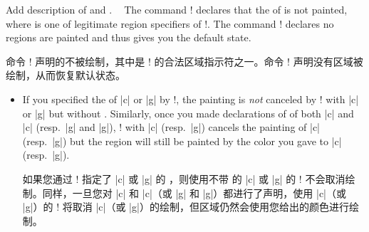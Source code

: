 \begin{description}



\item[\Midx{\!\nobackgroundcolor!}\marg{region}]\mbox{}
\Item[\Midx{\!\resetbackgroundcolor!}]\mbox{}\par
{}
{Add description of  and
    .}

The command \!\nobackgroundcolor! declares that the \bground{} of
 is not painted, where  is one of legitimate
region specifiers of \!\backgroundcolor!.  The command
\!\resetbackgroundcolor! declares no regions are painted and thus gives
you the default state.

命令 \!\nobackgroundcolor! 声明的\bground{}不被绘制，其中是 \!\backgroundcolor! 的合法区域指示符之一。命令 \!\resetbackgroundcolor! 声明没有区域被绘制，从而恢复默认状态。

\begin{itemize}
\item
If you specified the \bgpaint{} of |c| or |g| by
\!\backgroundcolor!, the painting is \emph{not} canceled by
\!\nobackgroundcolor! with |c| or |g| but without .  Similarly,
once you made declarations of \bgpaint{} of both |c| and |c|
(resp.\ |g| and |g|), \!\nobackgroundcolor! with |c|
(resp.\ |g|) cancels the painting of |c| (resp.\
|g|) but the region will still be painted by the color you gave
to |c| (resp.\ |g|).

如果您通过 \!\backgroundcolor! 指定了 |c| 或 |g| 的 \bgpaint{}，则使用不带  的 |c| 或 |g| 的 \!\nobackgroundcolor! 不会取消绘制。同样，一旦您对 |c| 和 |c|（或 |g| 和 |g|）都进行了声明，使用 |c|（或 |g|）的 \!\nobackgroundcolor! 将取消 |c|（或 |g|）的绘制，但区域仍然会使用您给出的颜色进行绘制。
\end{itemize}




\end{description}
